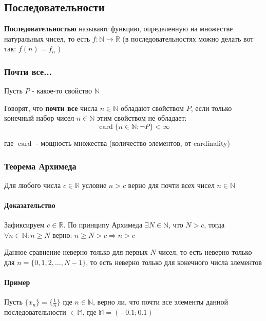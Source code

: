 \documentclass[class=article,a4paper,12pt,crop=false]{standalone}
\DeclareMathOperator{\card}{card}
\begin{document}
\subsection{Последовательности}

\textbf{Последовательностью} называют функцию, определенную на множестве натуральных
чисел, то есть $f: \mathbb{N} \rightarrow \mathbb{R}$ (в последовательностях можно
делать вот так: $f(n) = f_n$ )

\subsubsection{Почти все...}

Пусть $P$ - какое-то свойство $\mathbb{N}$

Говорят, что \textbf{почти все} числа $n \in \mathbb{N}$ обладают свойством $P$, если
только конечный набор чисел $n \in \mathbb{N}$ этим свойством не обладает:
\begin{equation}
  \card \{n \in \mathbb{N}: \lnot P\} < \infty
\end{equation}

где $\card$ - мощность множества (количество элементов, от cardinality)

\subsubsection{Теорема Архимеда}

Для любого числа $c \in \mathbb{R}$ условие $n > c$
верно для почти всех чисел $n \in \mathbb{N}$

\paragraph{Доказательство} Зафиксируем $c \in \mathbb{R}$. По принципу Архимеда 
$\exists N \in \mathbb{N}$, что $N > c$, тогда $\forall n \in \mathbb{N}: n \geq N$ верно:
$n \geq N > c \Rightarrow n > c$

Данное сравнение неверно только для первых $N$ чисел, то есть неверно только для
$n = \{0, 1, 2, \dots, N - 1\}$, то есть неверно только для конечного числа
элементов

\paragraph{Пример} Пусть $\{x_n\} = \{\frac{1}{n}\}$ где $n \in \mathbb{N}$, верно ли,
что почти все элементы данной последовательности $\in \mathbb{M}$, где $\mathbb{M} = (-0.1; 0.1)$
\end{document}
